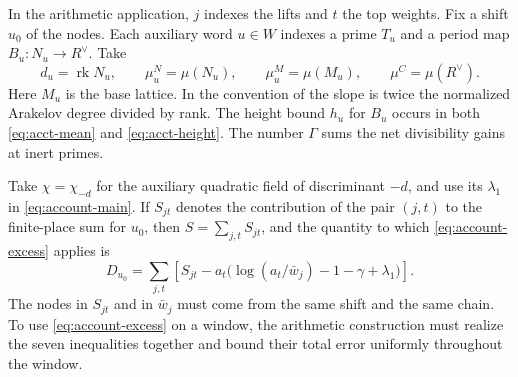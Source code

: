 In the arithmetic application, $j$ indexes the lifts and $t$ the top
weights. Fix a shift $u_0$ of the nodes. Each auxiliary word $u\in W$
indexes a prime $T_u$ and a period map $B_u\colon N_u\to R^\vee$. Take
\[
  d_u=\operatorname{rk}N_u,\qquad
  \mu^N_u=\mu(N_u),\qquad
  \mu^M_u=\mu(M_u),\qquad
  \mu^C=\mu(R^\vee).
\]
Here $M_u$ is the base lattice. In the convention of
\citep[\S15.1]{adriazola-grh} the slope is twice the normalized
Arakelov degree divided by rank. The height bound $h_u$ for $B_u$ occurs in
both \eqref{eq:acct-mean} and \eqref{eq:acct-height}.
The number $\Gamma$ sums the net divisibility gains at inert primes.

Take $\chi=\chi_{-d}$ for the auxiliary quadratic field of discriminant
$-d$, and use its $\lambda_1$ in \eqref{eq:account-main}.
If $S_{jt}$ denotes the contribution of the pair $(j,t)$ to the
finite-place sum for $u_0$, then $S=\sum_{j,t}S_{jt}$, and the quantity
to which \eqref{eq:account-excess} applies is
\[
  D_{u_0}=\sum_{j,t}\left[
    S_{jt}-a_t\bigl(\log(a_t/\bar w_j)-1-\gamma+\lambda_1\bigr)
  \right].
\]
The nodes in $S_{jt}$ and in $\bar w_j$ must come from the same shift
and the same chain. To use \eqref{eq:account-excess} on a window, the
arithmetic construction must realize the seven inequalities together
and bound their total error uniformly throughout the window.
